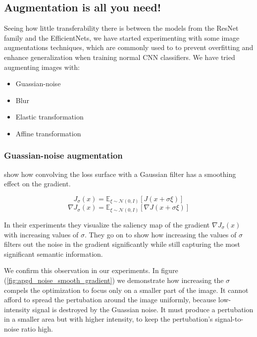 \subsection{Augmentation is all you need!}
Seeing how little transferability there is between the models from the ResNet family and the EfficientNets, we have started experimenting with some image augmentations techniques, which are commonly used to to prevent overfitting and enhance generalization when training normal CNN classifiers. 
 We have tried augmenting images with:


\begin{itemize}
    \item Guassian-noise
    \item Blur
    \item Elastic transformation
    \item Affine transformation
\end{itemize}


\subsubsection{Guassian-noise augmentation}

\cite{Wu2020TowardsUA} show how convolving the loss surface with a Gaussian filter has a smoothing effect on the gradient.

$$J_{\sigma}(x) = \mathbb{E}_{\xi \sim \mathcal{N}(0, I)}[J(x + \sigma \xi)]$$
$$\nabla J_{\sigma}(x) = \mathbb{E}_{\xi \sim \mathcal{N}(0, I)}[\nabla J(x + \sigma \xi)]$$

In their experiments they visualize the saliency map of the gradient $\nabla J_{\sigma}(x)$ with increasing values of $\sigma$.
They go on to show how increasing the values of $\sigma$ filters out the noise in the gradient significantly while still capturing the most significant semantic information. 

We confirm this observation in our experiments. In figure (\ref{fig:apgd_noise_smooth_gradient}) we demonstrate how increasing the $\sigma$ compels the optimization to focus only on a smaller part of the image. It cannot afford to spread the pertubation around the image uniformly, because low-intensity signal is destroyed by the Guassian noise. It must produce a pertubation in a smaller area but with higher intensity, to keep the pertubation's signal-to-noise ratio high.


